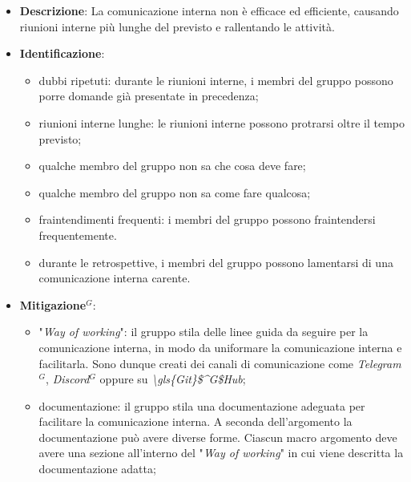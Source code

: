 \label{risk:comunicazione interna carente}
\begin{itemize}
	\item \textbf{Descrizione}:
	      La comunicazione interna non è efficace ed efficiente, causando riunioni
	      interne più lunghe del previsto e rallentando le attività.
	\item \textbf{Identificazione}:
	      \begin{itemize}
		      \item dubbi ripetuti: durante le riunioni interne, i membri del
		            gruppo possono porre domande già presentate in precedenza;

		      \item riunioni interne lunghe: le riunioni interne possono
		            protrarsi oltre il tempo previsto;

		      \item qualche membro del gruppo non sa che cosa deve fare;

		      \item qualche membro del gruppo non sa come fare qualcosa;

		      \item fraintendimenti frequenti: i membri del gruppo possono
		            fraintendersi frequentemente.

		      \item durante le retrospettive, i membri del gruppo possono
		            lamentarsi di una comunicazione interna carente.
	      \end{itemize}
	\item \textbf{\gls{Mitigazione}$^G$}:
	      \begin{itemize}
		      \item "\textit{Way of working}": il gruppo stila delle linee guida
		            da seguire per la comunicazione interna, in modo da
		            uniformare la comunicazione interna e facilitarla. Sono
		            dunque creati dei canali di comunicazione come
		            \textit{\gls{Telegram}$^G$}, \textit{\gls{Discord}$^G$} oppure su
		            \textit{\gls{\gls{Git}$^G$Hub}};

		      \item documentazione: il gruppo stila una documentazione
		            adeguata per facilitare la comunicazione interna. A seconda
		            dell'argomento la documentazione può avere diverse forme.
		            Ciascun macro argomento deve avere una sezione all'interno
		            del "\textit{Way of working}" in cui viene descritta la
		            documentazione adatta;


\end{itemize}
\end{itemize}
